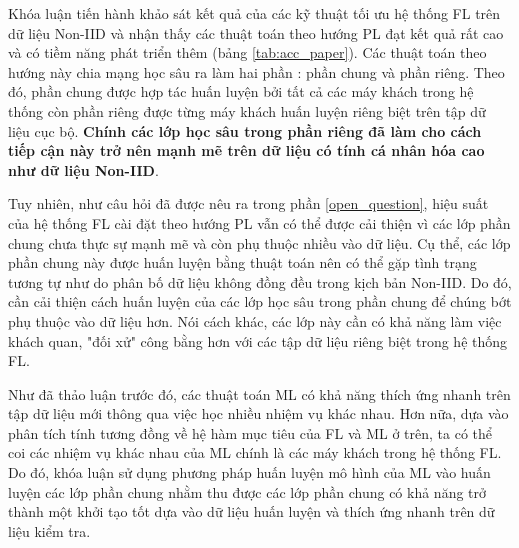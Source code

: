 Khóa luận tiến hành khảo sát kết quả của các kỹ thuật tối ưu hệ thống FL trên dữ liệu Non-IID và nhận thấy các thuật toán theo hướng PL đạt kết quả rất cao và có tiềm năng phát triển thêm (bảng \ref{tab:acc_paper}). Các thuật toán theo hướng này chia mạng học sâu ra làm hai phần \cite{zhu2021federated}: phần chung và phần riêng. Theo đó, phần chung được hợp tác huấn luyện bởi tất cả các máy khách trong hệ thống còn phần riêng được từng máy khách huấn luyện riêng biệt trên tập dữ liệu cục bộ. \textbf{Chính các lớp học sâu trong phần riêng đã làm cho cách tiếp cận này trở nên mạnh mẽ trên dữ liệu có tính cá nhân hóa cao như dữ liệu Non-IID}.

\begin{table}[H]
    \centering
    \caption{Độ chính xác (\%) của các hệ thống FL trên dữ liệu Non-IID của tập dữ liệu CIFAR-10 \cite{shamsian2021personalized}. Các thuật toán PL được in đậm.}
    \label{tab:acc_paper}
\end{table}

Tuy nhiên, như câu hỏi đã được nêu ra trong phần \ref{open_question}, hiệu suất của hệ thống FL cài đặt theo hướng PL vẫn có thể được cải thiện vì các lớp phần chung chưa thực sự mạnh mẽ và còn phụ thuộc nhiều vào dữ liệu. Cụ thể, các lớp phần chung này được huấn luyện bằng thuật toán  nên có thể gặp tình trạng tương tự như  do phân bố dữ liệu không đồng đều trong kịch bản Non-IID. Do đó, cần cải thiện cách huấn luyện của các lớp học sâu trong phần chung để chúng bớt phụ thuộc vào dữ liệu hơn. Nói cách khác, các lớp này cần có khả năng làm việc khách quan, "đối xử" công bằng hơn với các tập dữ liệu riêng biệt trong hệ thống FL.

Như đã thảo luận trước đó, các thuật toán ML có khả năng thích ứng nhanh trên tập dữ liệu mới thông qua việc học nhiều nhiệm vụ khác nhau. Hơn nữa, dựa vào phân tích tính tương đồng về hệ hàm mục tiêu của FL và ML ở trên, ta có thể coi các nhiệm vụ khác nhau của ML chính là các máy khách trong hệ thống FL. Do đó, khóa luận sử dụng phương pháp huấn luyện mô hình của ML vào huấn luyện các lớp phần chung nhằm thu được các lớp phần chung có khả năng trở thành một khởi tạo tốt dựa vào dữ liệu huấn luyện và thích ứng nhanh trên dữ liệu kiểm tra.

